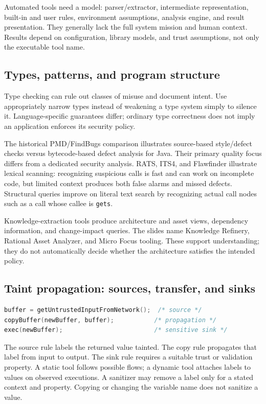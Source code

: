 \documentclass[11pt,a4paper]{article}
\numberwithin{figure}{section}
\begin{document}
Automated tools need a model: parser/extractor, intermediate representation, built-in and user rules, environment assumptions, analysis engine, and result presentation. They generally lack the full system mission and human context. Results depend on configuration, library models, and trust assumptions, not only the executable tool name.

\subsection{Types, patterns, and program structure}
Type checking can rule out classes of misuse and document intent. Use appropriately narrow types instead of weakening a type system simply to silence it. Language-specific guarantees differ; ordinary type correctness does not imply an application enforces its security policy.

The historical PMD/FindBugs comparison illustrates source-based style/defect checks versus bytecode-based defect analysis for Java. Their primary quality focus differs from a dedicated security analysis. RATS, ITS4, and Flawfinder illustrate lexical scanning: recognizing suspicious calls is fast and can work on incomplete code, but limited context produces both false alarms and missed defects. Structural queries improve on literal text search by recognizing actual call nodes such as a call whose callee is \texttt{gets}.

Knowledge-extraction tools produce architecture and asset views, dependency information, and change-impact queries. The slides name Knowledge Refinery, Rational Asset Analyzer, and Micro Focus tooling. These support understanding; they do not automatically decide whether the architecture satisfies the intended policy.

\subsection{Taint propagation: sources, transfer, and sinks}
\begin{lstlisting}[language=C]
buffer = getUntrustedInputFromNetwork();  /* source */
copyBuffer(newBuffer, buffer);           /* propagation */
exec(newBuffer);                         /* sensitive sink */
\end{lstlisting}
The source rule labels the returned value tainted. The copy rule propagates that label from input to output. The sink rule requires a suitable trust or validation property. A static tool follows possible flows; a dynamic tool attaches labels to values on observed executions. A sanitizer may remove a label only for a stated context and property. Copying or changing the variable name does not sanitize a value.
\end{document}

